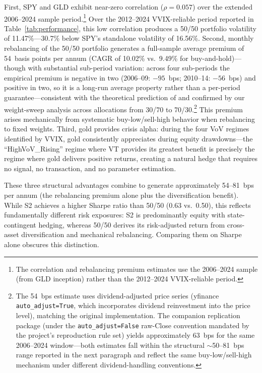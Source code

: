 \documentclass[12pt,a4paper]{article}
\begin{document}
First, SPY and GLD exhibit near-zero correlation ($\rho = 0.057$) over the extended 2006--2024 sample period.\footnote{The correlation and rebalancing premium estimates use the 2006--2024 sample (from GLD inception) rather than the 2012--2024 VVIX-reliable period.} Over the 2012--2024 VVIX-reliable period reported in Table~\ref{tab:performance}, this low correlation produces a 50/50 portfolio volatility of 11.47\%---30.7\% below SPY's standalone volatility of 16.56\%. Second, monthly rebalancing of the 50/50 portfolio generates a full-sample average premium of 54~basis points per annum (CAGR of 10.02\% vs.\ 9.49\% for buy-and-hold)---though with substantial sub-period variation: across four sub-periods the empirical premium is negative in two (2006--09: $-95$~bps; 2010--14: $-56$~bps) and positive in two, so it is a long-run average property rather than a per-period guarantee---consistent with the theoretical prediction of \citet{booth1992} and confirmed by our weight-sweep analysis across allocations from 30/70 to 70/30.\footnote{The 54~bps estimate uses dividend-adjusted price series (yfinance \texttt{auto\_adjust=True}, which incorporates dividend reinvestment into the price level), matching the original implementation. The companion replication package (under the \texttt{auto\_adjust=False} raw-Close convention mandated by the project's reproduction rule set) yields approximately 63~bps for the same 2006--2024 window---both estimates fall within the structural $\sim$50--81~bps range reported in the next paragraph and reflect the same buy-low/sell-high mechanism under different dividend-handling conventions.} This premium arises mechanically from systematic buy-low/sell-high behavior when rebalancing to fixed weights. Third, gold provides crisis alpha: during the four VoV regimes identified by VVIX, gold consistently appreciates during equity drawdowns---the ``HighVoV\_Rising'' regime where VT provides its greatest benefit is precisely the regime where gold delivers positive returns, creating a natural hedge that requires no signal, no transaction, and no parameter estimation.

These three structural advantages combine to generate approximately 54--81~bps per annum (the rebalancing premium alone plus the diversification benefit). While S2 achieves a higher Sharpe ratio than 50/50 (0.63 vs.\ 0.50), this reflects fundamentally different risk exposures: S2 is predominantly equity with state-contingent hedging, whereas 50/50 derives its risk-adjusted return from cross-asset diversification and mechanical rebalancing. Comparing them on Sharpe alone obscures this distinction.
\end{document}
